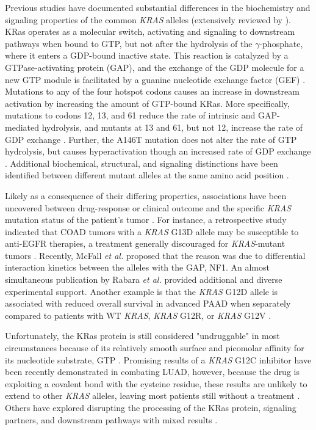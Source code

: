 \documentclass[english, 12pt, letterpaper]{article}
\newcommand{\KRAS}{\emph{KRAS}}
\newcommand{\kras}{KRas}
\begin{document}
Previous studies have documented substantial differences in the biochemistry and signaling properties of the common \KRAS{} alleles (extensively reviewed by \cite{Miller2012, Li2018}).
\kras{} operates as a molecular switch, activating and signaling to downstream pathways when bound to GTP, but not after the hydrolysis of the $\gamma$-phosphate, where it enters a GDP-bound inactive state. This reaction is catalyzed by a GTPase-activating protein (GAP), and the exchange of the GDP molecule for a new GTP module is facilitated by a guanine nucleotide exchange factor (GEF) \cite{Barbacid1987}.
Mutations to any of the four hotspot codons causes an increase in downstream activation by increasing the amount of GTP-bound \kras{}.
More specifically, mutations to codons 12, 13, and 61 reduce the rate of intrinsic and GAP-mediated hydrolysis, and mutants at 13 and 61, but not 12, increase the rate of GDP exchange \cite{Hunter2015a, Smith2013}.
Further, the A146T mutation does not alter the rate of GTP hydrolysis, but causes hyperactivation though an increased rate of GDP exchange \cite{Edkins2006, Janakiraman2010, Poulin2019}.
Additional biochemical, structural, and signaling distinctions have been identified between different mutant alleles at the same amino acid position \cite{Poulin2019, Hobbs2019, Hunter2015a, Li2018, Yu2018, Kovalski2019, Ihle2012, Spoerner2004, Smith2014a, Pantsar2018}.

Likely as a consequence of their differing properties, associations have been uncovered between drug-response or clinical outcome and the specific \KRAS{} mutation status of the patient's tumor \cite{Haigis2017, Li2018}.
For instance, a retrospective study indicated that COAD tumors with a \KRAS{} G13D allele may be susceptible to anti-EGFR therapies, a treatment generally discouraged for \KRAS{}-mutant tumors \cite{DeRoock2010}. 
Recently, McFall \emph{et al.} \cite{McFall2019} proposed that the reason was due to differential interaction kinetics between the alleles with the GAP, NF1.
An almost simultaneous publication by Rabara \emph{et al.} \cite{Rabara2019} provided additional and diverse experimental support.
Another example is that the \KRAS{} G12D allele is associated with reduced overall survival in advanced PAAD when separately compared to patients with WT \KRAS{}, \KRAS{} G12R, or \KRAS{} G12V \cite{Bournet2016}.

Unfortunately, the \kras{} protein is still considered "undruggable" in most circumstances because of its relatively smooth surface and picomolar affinity for its nucleotide substrate, GTP \cite{Spencer-Smith2019}.
Promising results of a \KRAS{} G12C inhibitor have been recently demonstrated in combating LUAD, however, because the drug is exploiting a covalent bond with the cysteine residue, these results are unlikely to extend to other \KRAS{} alleles, leaving most patients still without a treatment \cite{Lim2014, Ostrem2013K-RasG12CInteractions., Patricelli2016SelectiveState., Lito2016Allele-specificMechanism., Canon2019}.
Others have explored disrupting the processing of the \kras{} protein, signaling partners, and downstream pathways with mixed results \cite{Spencer-Smith2019}.
\end{document}
